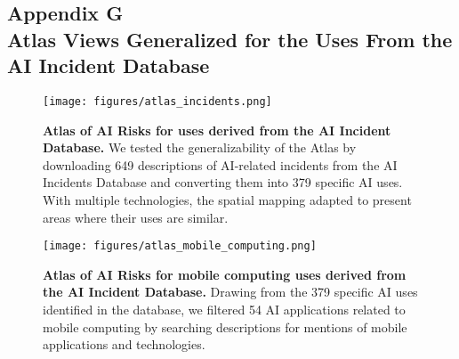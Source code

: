 \clearpage
\subsection{Appendix G \\Atlas Views Generalized for the Uses From the AI Incident Database}

\begin{figure}[h!]
  \centering
\texttt{[image: figures/atlas\_incidents.png]}
  \caption{\textbf{Atlas of AI Risks for uses derived from the AI Incident Database.} We tested the generalizability of the Atlas by downloading 649 descriptions of AI-related incidents from the AI Incidents Database \cite{mcgregor2021preventing} and converting them into 379 specific AI uses. With multiple technologies, the spatial mapping adapted to present areas where their uses are similar.}
  \label{fig:incidents}
\end{figure}


\begin{figure}[h!]
  \centering
\texttt{[image: figures/atlas\_mobile\_computing.png]}
  \caption{\textbf{Atlas of AI Risks for mobile computing uses derived from the AI Incident Database.} Drawing from the 379 specific AI uses identified in the database, we filtered 54 AI applications related to mobile computing by searching descriptions for mentions of mobile applications and technologies.}
  \label{fig:mobile}
\end{figure}


